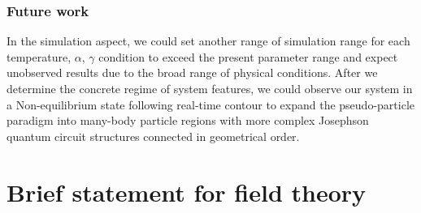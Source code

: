 \documentclass{article}[12pt]
\numberwithin{equation}{section}
\begin{document}
\begin{spacing}{1.5}
\subsubsection*{Future work}
In the simulation aspect, we could set another range of simulation range for each temperature, 
$\alpha$, $\gamma$ condition to exceed the present parameter range and expect unobserved results 
due to the broad range of physical conditions. After we determine the concrete regime of system features, 
we could observe our system in a Non-equilibrium state following real-time contour to expand the pseudo-particle paradigm 
into many-body particle regions with more complex Josephson quantum circuit structures connected in geometrical order.
\end{spacing}
\pagebreak
\newpage
\appendix
\section{Brief statement for field theory}
\end{document}
